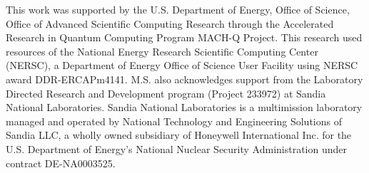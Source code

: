 This work was supported by the U.S. Department of Energy, Office of Science, Office of Advanced Scientific Computing Research through the Accelerated Research in Quantum Computing Program MACH-Q Project. This research used resources of the National Energy Research Scientific Computing Center (NERSC), a Department of Energy Office of Science User Facility using NERSC award DDR-ERCAPm4141. M.S. also acknowledges support from the Laboratory
Directed Research and Development program (Project 233972) at Sandia National Laboratories. Sandia National Laboratories is a multimission laboratory managed and operated by National Technology and Engineering Solutions of Sandia LLC, a wholly owned subsidiary of Honeywell International Inc. for the U.S. Department of Energy’s National Nuclear Security Administration under contract DE-NA0003525.